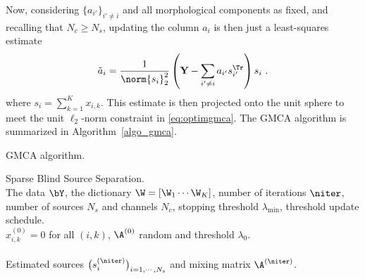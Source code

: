 Now, considering $\{a_{i'}\}_{i' \neq i}$ and all morphological components as fixed, and recalling that $N_c \geq N_s$, updating the column $a_i$ is then just a least-squares estimate
\begin{equation}
\label{eq:a_update}
\tilde{a}_i = \frac{1}{\norm{s_i}^2_2} \left({\bf Y} - \sum_{i' \neq i} a_{i'} s_{i'}^\Tr\right) s_i ~.
\end{equation}
where $s_i = \sum_{k=1}^K x_{i,k}$. This estimate is then projected onto the unit sphere to meet the unit $\ell_2$-norm constraint in \eqref{eq:optimgmca}.
The GMCA algorithm is summarized in Algorithm~\ref{algo_gmca}.

{\linespread{1}
\begin{algorithm}[htb]
\caption{GMCA algorithm.}
\label{algo_gmca}
 Sparse Blind Source Separation.\\
 The data $\bY$, the dictionary $\W=[\W_1 \cdots \W_K]$, number of iterations $\niter$, number of sources $N_s$ and channels $N_c$, stopping threshold $\lambda_{\min}$, threshold update schedule.\\
 $x_{i,k}^{(0)} = 0$ for all $(i,k)$, $\A^{(0)}$ random and threshold $\lambda_0$.\\
 \\
 Estimated sources $\big(s^{(\niter)}_i\big)_{i=1,\cdots,N_s}$ and mixing matrix ${\A}^{(\niter)}$.
\end{algorithm}}

